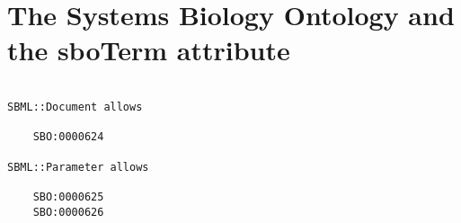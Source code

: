 \section{The Systems Biology Ontology and the sboTerm attribute}
\label{apdx-sbo}

\begin{verbatim}

SBML::Document allows

    SBO:0000624

SBML::Parameter allows

    SBO:0000625
    SBO:0000626
    
\end{verbatim}